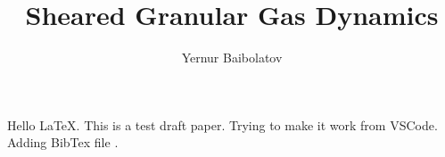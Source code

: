 \documentclass[preprint, aps, pra]{revtex4-1}
\begin{document}
  \title{Sheared Granular Gas Dynamics}
  \author{Yernur Baibolatov}
  \maketitle
  Hello \LaTeX. This is a test draft paper. Trying to make it work from VSCode. Adding BibTex file
  \cite{Brilliantov:2004book, Smith:2013jd}.


  
  
\end{document}

